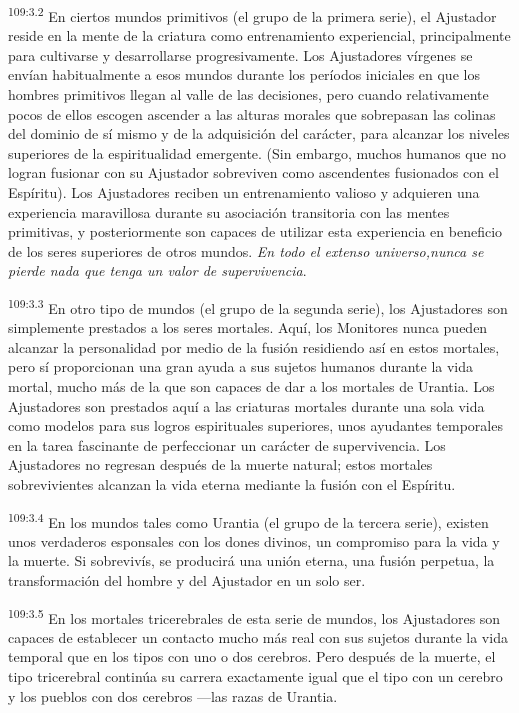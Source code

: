 \documentclass[twoside, 11pt]{book}
\begin{document}
\par
\textsuperscript{109:3.2} En ciertos mundos primitivos (el grupo de la primera serie), el Ajustador reside en la mente de la criatura como entrenamiento experiencial, principalmente para cultivarse y desarrollarse progresivamente. Los Ajustadores vírgenes se envían habitualmente a esos mundos durante los períodos iniciales en que los hombres primitivos llegan al valle de las decisiones, pero cuando relativamente pocos de ellos escogen ascender a las alturas morales que sobrepasan las colinas del dominio de sí mismo y de la adquisición del carácter, para alcanzar los niveles superiores de la espiritualidad emergente. (Sin embargo, muchos humanos que no logran fusionar con su Ajustador sobreviven como ascendentes fusionados con el Espíritu). Los Ajustadores reciben un entrenamiento valioso y adquieren una experiencia maravillosa durante su asociación transitoria con las mentes primitivas, y posteriormente son capaces de utilizar esta experiencia en beneficio de los seres superiores de otros mundos. \textit{En todo el extenso universo,nunca se pierde nada que tenga un valor de supervivencia}.

\par
\textsuperscript{109:3.3} En otro tipo de mundos (el grupo de la segunda serie), los Ajustadores son simplemente prestados a los seres mortales. Aquí, los Monitores nunca pueden alcanzar la personalidad por medio de la fusión residiendo así en estos mortales, pero sí proporcionan una gran ayuda a sus sujetos humanos durante la vida mortal, mucho más de la que son capaces de dar a los mortales de Urantia. Los Ajustadores son prestados aquí a las criaturas mortales durante una sola vida como modelos para sus logros espirituales superiores, unos ayudantes temporales en la tarea fascinante de perfeccionar un carácter de supervivencia. Los Ajustadores no regresan después de la muerte natural; estos mortales sobrevivientes alcanzan la vida eterna mediante la fusión con el Espíritu.

\par
\textsuperscript{109:3.4} En los mundos tales como Urantia (el grupo de la tercera serie), existen unos verdaderos esponsales con los dones divinos, un compromiso para la vida y la muerte. Si sobrevivís, se producirá una unión eterna, una fusión perpetua, la transformación del hombre y del Ajustador en un solo ser.

\par
\textsuperscript{109:3.5} En los mortales tricerebrales de esta serie de mundos, los Ajustadores son capaces de establecer un contacto mucho más real con sus sujetos durante la vida temporal que en los tipos con uno o dos cerebros. Pero después de la muerte, el tipo tricerebral continúa su carrera exactamente igual que el tipo con un cerebro y los pueblos con dos cerebros ---las razas de Urantia.
\end{document}
